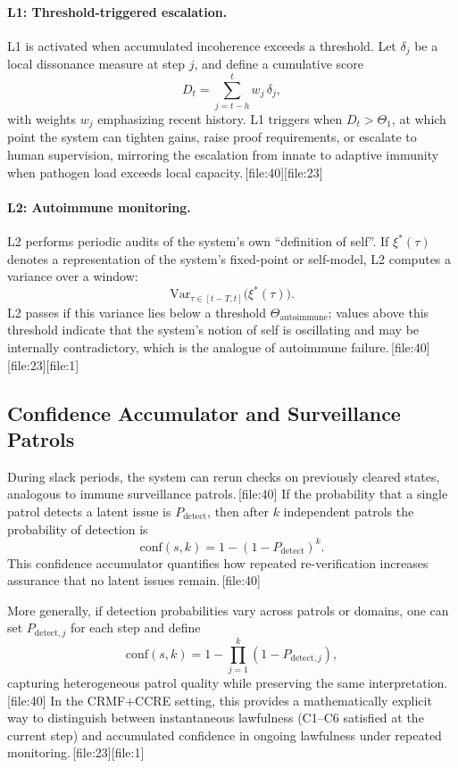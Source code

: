 \documentclass[11pt]{article}
\begin{document}
\paragraph{L1: Threshold-triggered escalation.}

L1 is activated when accumulated incoherence exceeds a threshold.
Let \(\delta_j\) be a local dissonance measure at step \(j\), and define a cumulative score
\[
D_t = \sum_{j=t-h}^{t} w_j\,\delta_j,
\]
with weights \(w_j\) emphasizing recent history.
L1 triggers when \(D_t > \Theta_1\), at which point the system can tighten gains, raise proof requirements, or escalate to human supervision, mirroring the escalation from innate to adaptive immunity when pathogen load exceeds local capacity.\,[file:40][file:23]

\paragraph{L2: Autoimmune monitoring.}

L2 performs periodic audits of the system’s own “definition of self”.
If \(\xi^*(\tau)\) denotes a representation of the system’s fixed-point or self-model, L2 computes a variance over a window:
\[
\mathrm{Var}_{\tau \in [t-T,t]}\big(\xi^*(\tau)\big).
\]
L2 passes if this variance lies below a threshold \(\Theta_{\mathrm{autoimmune}}\); values above this threshold indicate that the system’s notion of self is oscillating and may be internally contradictory, which is the analogue of autoimmune failure.\,[file:40][file:23][file:1]

\subsection*{Confidence Accumulator and Surveillance Patrols}

During slack periods, the system can rerun checks on previously cleared states, analogous to immune surveillance patrols.\,[file:40]
If the probability that a single patrol detects a latent issue is \(P_{\mathrm{detect}}\), then after \(k\) independent patrols the probability of detection is
\[
\mathrm{conf}(s,k) = 1 - (1 - P_{\mathrm{detect}})^k.
\]
This confidence accumulator quantifies how repeated re-verification increases assurance that no latent issues remain.\,[file:40]

More generally, if detection probabilities vary across patrols or domains, one can set \(P_{\mathrm{detect},j}\) for each step and define
\[
\mathrm{conf}(s,k) = 1 - \prod_{j=1}^{k} (1 - P_{\mathrm{detect},j}),
\]
capturing heterogeneous patrol quality while preserving the same interpretation.\,[file:40]
In the CRMF+CCRE setting, this provides a mathematically explicit way to distinguish between instantaneous lawfulness (C1–C6 satisfied at the current step) and accumulated confidence in ongoing lawfulness under repeated monitoring.\,[file:23][file:1]
\end{document}
